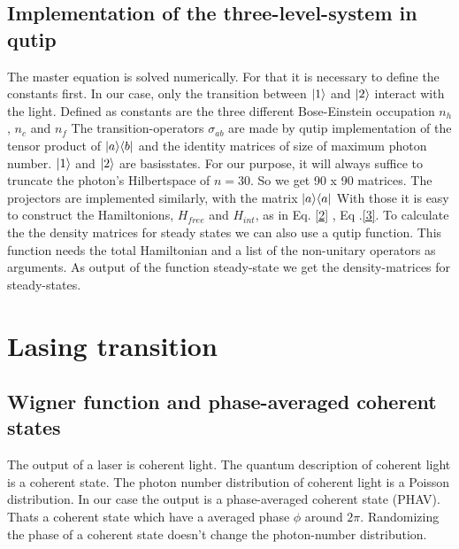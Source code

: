 \documentclass[12pt,a4paper]{article}
\DeclarePairedDelimiter\bra{\langle}{\rvert}
\DeclarePairedDelimiter\ket{\lvert}{\rangle}
\begin{document}
\subsection{Implementation of the three-level-system in qutip}
The master equation is solved numerically. For that it is necessary to define the constants first.
In our case, only the transition between $\ket{1}$ and $\ket{2}$ interact with the light. 
Defined as constants are the three different Bose-Einstein occupation $n_h$, $n_c$ and $n_f$
The transition-operators $\sigma_{ab}$ are  made by qutip implementation of the tensor product of $\ket{a}\bra{b}$ and the identity matrices of size of maximum photon number. 
$\ket{1}$ and $\ket{2}$ are basisstates. For our purpose, it will  always suffice to truncate the photon's Hilbertspace of $n=30$. So we get  90 x 90 matrices. 
The projectors are implemented similarly, with the matrix $\ket{a}\bra{a}$
With those it is easy to construct the Hamiltonions, $H_{free}$ and $H_{int}$, as in Eq. \eqref{2} , Eq .\eqref{3}.
To calculate the the density matrices for steady states we can also use a qutip function.
This function needs the total Hamiltonian and a list of the non-unitary operators as arguments.
As output of the function steady-state we get the density-matrices for steady-states. \cite{Nation2022}
\section{Lasing transition}

\subsection{Wigner function and phase-averaged coherent states}
The output of a laser is coherent light.
The quantum description of coherent light is a coherent state. The photon number distribution of coherent light is a Poisson distribution.
In our case the output is a phase-averaged coherent state (PHAV). 
Thats a coherent state which have a averaged phase $\phi$ around $2\pi$.
Randomizing the phase of a coherent state doesn't change the photon-number distribution. \\
\end{document}
